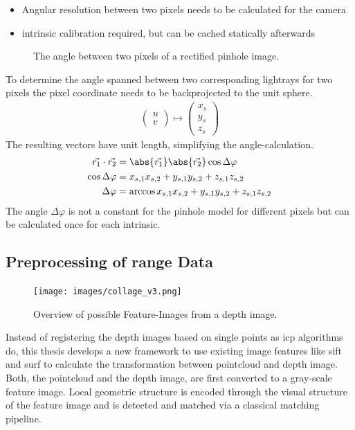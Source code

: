 \begin{itemize}
    \item Angular resolution between two pixels needs to be calculated for the camera
    \item intrinsic calibration required, but can be cached statically afterwards
\end{itemize}

\begin{figure}[H]
    
	\caption[Angle between two pixels in the pinhole model]{The angle between two pixels of a rectified pinhole image.}
\end{figure}
To determine the angle spanned between two corresponding lightrays for two pixels the pixel coordinate needs to be backprojected to the unit sphere.
\begin{align}
    \begin{pmatrix} u \\ v \end{pmatrix} \mapsto \begin{pmatrix} x_s \\ y_s \\ z_s \end{pmatrix}
\end{align}
The resulting vectors have unit length, simplifying the angle-calculation.
\begin{align}
    \vec{r_1} \cdot \vec{r_2} &= \abs{\vec{r_1}} \abs{\vec{r_2}} \cos \Delta\varphi \\
    \cos \Delta\varphi &= x_{s,1} x_{s,2} + y_{s,1} y_{s,2} + z_{s,1} z_{s,2} \\
    \Delta\varphi &= \arccos{x_{s,1} x_{s,2} + y_{s,1} y_{s,2} + z_{s,1} z_{s,2}}
\end{align}
The angle $\Delta\varphi$ is not a constant for the pinhole model for different pixels but can be calculated once for each intrinsic.

\subsection{Preprocessing of range Data}\label{preprocessing-of-range-data}

\begin{figure}[H]
    \centering
    \texttt{[image: images/collage\_v3.png]}
    \caption{Overview of possible Feature-Images from a depth image.}
\end{figure}

Instead of registering the depth images based on single points as \gls{icp} algorithms do, this thesis develops a new framework to use existing image features like \Gls{sift} and \Gls{surf} to calculate the transformation between pointcloud and depth image.
Both, the pointcloud and the depth image, are first converted to a gray-scale feature image.
Local geometric structure is encoded through the visual structure of the feature image and is detected and matched via a classical matching pipeline.

